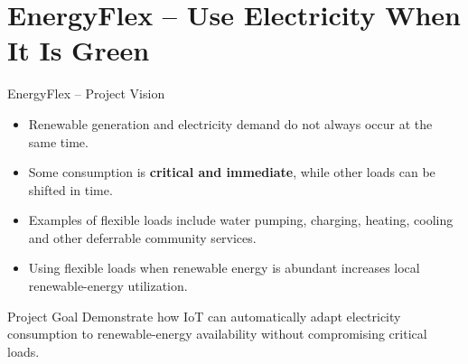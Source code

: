 \part[nopartpage]{EnergyFlex -- Use Electricity When It Is Green}

\begin{frame}{EnergyFlex -- Project Vision}
\begin{itemize}
    \item Renewable generation and electricity demand do not always occur at the same time.
    \item Some consumption is \textbf{critical and immediate}, while other loads can be shifted in time.
    \item Examples of flexible loads include water pumping, charging, heating, cooling and other deferrable community services.
    \item Using flexible loads when renewable energy is abundant increases local renewable-energy utilization.
\end{itemize}

\begin{block}{Project Goal}
Demonstrate how IoT can automatically adapt electricity consumption to renewable-energy availability without compromising critical loads.
\end{block}
\end{frame}
